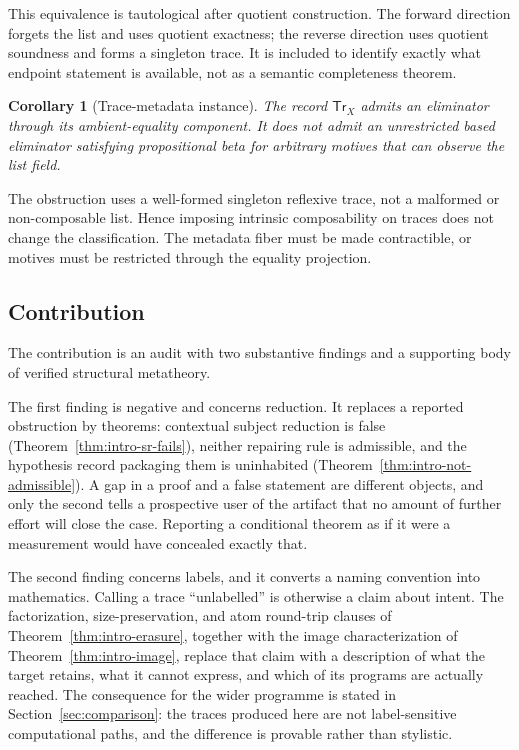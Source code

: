 \documentclass[10pt,reqno]{amsart}
\newtheorem{corollary}[theorem]{Corollary}
\newcommand{\Tr}{\mathsf{Tr}}
\begin{document}
This equivalence is tautological after quotient construction.  The forward
direction forgets the list and uses quotient exactness; the reverse direction
uses quotient soundness and forms a singleton trace.  It is included to
identify exactly what endpoint statement is available, not as a semantic
completeness theorem.

\begin{corollary}[Trace-metadata instance]
\label{thm:intro-obstruction}
The record \(\Tr_X\) admits an eliminator through its ambient-equality
component.  It does not admit an unrestricted based eliminator satisfying
propositional beta for arbitrary motives that can observe the list field.
\end{corollary}

The obstruction uses a well-formed singleton reflexive trace, not a malformed
or non-composable list.  Hence imposing intrinsic composability on traces
does not change the classification.  The metadata fiber must be made
contractible, or motives must be restricted through the equality projection.

\subsection*{Contribution}

The contribution is an audit with two substantive findings and a supporting
body of verified structural metatheory.

The first finding is negative and concerns reduction.  It replaces a reported
obstruction by theorems: contextual subject reduction is false
(Theorem~\ref{thm:intro-sr-fails}), neither repairing rule is admissible, and
the hypothesis record packaging them is uninhabited
(Theorem~\ref{thm:intro-not-admissible}).  A gap in a proof and a false
statement are different objects, and only the second tells a prospective user of
the artifact that no amount of further effort will close the case.  Reporting a
conditional theorem as if it were a measurement would have concealed exactly
that.

The second finding concerns labels, and it converts a naming convention into
mathematics.  Calling a trace ``unlabelled'' is otherwise a claim about intent.
The factorization, size-preservation, and atom round-trip clauses of
Theorem~\ref{thm:intro-erasure}, together with the image characterization of
Theorem~\ref{thm:intro-image}, replace that claim with a description of what the
target retains, what it cannot express, and which of its programs are actually
reached.  The
consequence for the wider programme is stated in Section~\ref{sec:comparison}:
the traces produced here are not label-sensitive computational paths, and the
difference is provable rather than stylistic.
\end{document}
